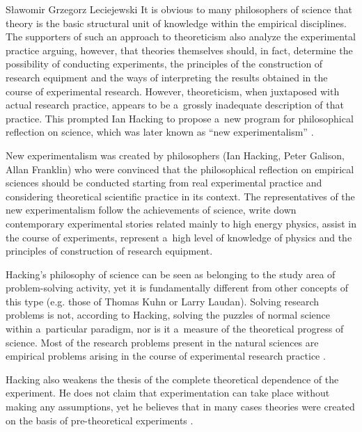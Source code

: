 \begin{artengenv}{Sławomir Grzegorz Leciejewski}
It is obvious to many philosophers of science that theory is the basic structural unit of knowledge within the empirical disciplines. The supporters of such an approach to theoreticism also analyze the experimental practice arguing, however, that theories themselves should, in fact, determine the possibility of conducting experiments, the principles of the construction of research equipment and the ways of interpreting the results obtained in the course of experimental research. However, theoreticism, when juxtaposed with actual research practice, appears to be a~grossly inadequate description of that practice. This prompted Ian Hacking to propose a~new program for philosophical reflection on science, which was later known as ``new experimentalism'' 
\parencites[][]{hacking_representing_1983}[][]{ackermann_new_1989}.%




New experimentalism was created by philosophers (Ian Hacking, Peter Galison, Allan Franklin) who were convinced that the philosophical reflection on empirical sciences should be conducted starting from real experimental practice and considering theoretical scientific practice in its context. The representatives of the new experimentalism follow the achievements of science, write down contemporary experimental stories related mainly to high energy physics, assist in the course of experiments, represent a~high level of knowledge of physics and the principles of construction of research equipment.



Hacking's philosophy of science can be seen as belonging to the study area of problem-solving activity, yet it is fundamentally different from other concepts of this type (e.g. those of Thomas Kuhn or Larry Laudan). Solving research problems is not, according to Hacking, solving the puzzles of normal science within a~particular paradigm, nor is it a~measure of the theoretical progress of science. Most of the research problems present in the natural sciences are empirical problems arising in the course of experimental research practice 
\parencite[][]{sobczynska_why_2021}.%

\enlargethispage{1.5\baselineskip}


Hacking also weakens the thesis of the complete theoretical dependence of the experiment. He does not claim that experimentation can take place without making any assumptions, yet he believes that in many cases theories were created on the basis of pre-theoretical experiments 
\parencite[][]{hacking_representing_1983}.%





\end{artengenv}
